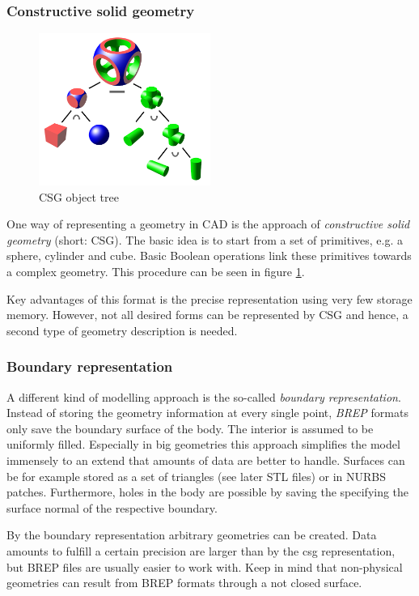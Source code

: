 \subsubsection{Constructive solid geometry}
\begin{figure}
\centering
\includegraphics[width=0.5\textwidth]{Pictures/Csg_tree.png}
\caption{CSG object tree}
\label{fig:csg_tree}
\end{figure}
One way of representing a geometry in CAD is the approach of \emph{constructive solid geometry} (short: CSG). The basic idea is to start from a set of primitives, e.g. a sphere, cylinder and cube. Basic Boolean operations link these primitives towards a complex geometry. This procedure can be seen in figure \ref{fig:csg_tree}.

Key advantages of this format is the precise representation using very few storage memory. However, not all desired forms can be represented by CSG and hence, a second type of geometry description is needed. 
\subsubsection{Boundary representation}
A different kind of modelling approach is the so-called \emph{boundary representation}. Instead of storing the geometry information at every single point, \emph{BREP} formats only save the boundary surface of the body. The interior is assumed to be uniformly filled. Especially in big geometries this approach simplifies the model immensely to an extend that amounts of data are better to handle. Surfaces can be for example stored as a set of triangles (see later STL files) or in NURBS patches.
Furthermore, holes in the body are possible by saving the specifying the surface normal of the respective boundary. 

By the boundary representation arbitrary geometries can be created. Data amounts to fulfill a certain precision are larger than by the csg representation, but BREP files are usually easier to work with. Keep in mind that non-physical geometries can result from BREP formats through a not closed surface.
